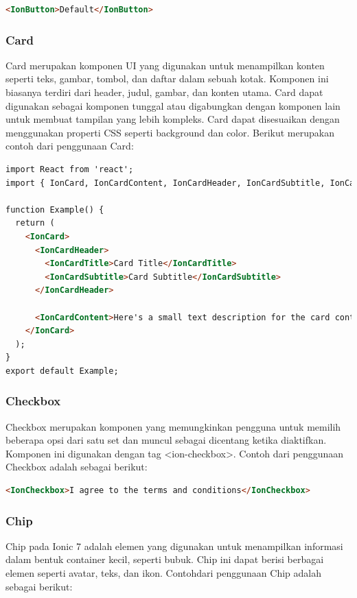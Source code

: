 \begin{lstlisting}[language=HTML, caption=Contoh kode untuk membuat Button, label=kode:ion-button]
<IonButton>Default</IonButton>
\end{lstlisting}

\subsubsection{Card}
Card merupakan komponen UI yang digunakan untuk menampilkan konten seperti teks, gambar, tombol, dan daftar dalam sebuah kotak. Komponen ini biasanya terdiri dari header, judul, gambar, dan konten utama. Card dapat digunakan sebagai komponen tunggal atau digabungkan dengan komponen lain untuk membuat tampilan yang lebih kompleks. Card dapat disesuaikan dengan menggunakan properti CSS seperti background dan color. Berikut merupakan contoh dari penggunaan Card:

\begin{lstlisting}[language=HTML, caption=Contoh kode untuk membuat Card, label=kode:ion-card]
import React from 'react';
import { IonCard, IonCardContent, IonCardHeader, IonCardSubtitle, IonCardTitle } from '@ionic/react';

function Example() {
  return (
    <IonCard>
      <IonCardHeader>
        <IonCardTitle>Card Title</IonCardTitle>
        <IonCardSubtitle>Card Subtitle</IonCardSubtitle>
      </IonCardHeader>

      <IonCardContent>Here's a small text description for the card content. Nothing more, nothing less.</IonCardContent>
    </IonCard>
  );
}
export default Example;
\end{lstlisting}

\subsubsection{Checkbox}
Checkbox merupakan komponen yang memungkinkan pengguna untuk memilih beberapa opsi dari satu set dan muncul sebagai dicentang ketika diaktifkan. Komponen ini digunakan dengan tag <ion-checkbox>. Contoh dari penggunaan Checkbox adalah sebagai berikut:

\begin{lstlisting}[language=HTML, caption=Contoh kode untuk membuat Checkbox, label=kode:ion-checkbox]
<IonCheckbox>I agree to the terms and conditions</IonCheckbox>
\end{lstlisting}

\subsubsection{Chip}
Chip pada Ionic 7 adalah elemen yang digunakan untuk menampilkan informasi dalam bentuk container kecil, seperti bubuk. Chip ini dapat berisi berbagai elemen seperti avatar, teks, dan ikon. Contohdari penggunaan Chip adalah sebagai berikut:

